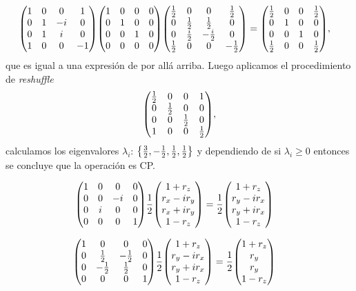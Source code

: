 
\begin{align}
\mqty(
 1 & 0 & 0 & 1 \\
 0 & 1 & -i & 0 \\
 0 & 1 & i & 0 \\
 1 & 0 & 0 & -1 
)
\mqty(
 1 & 0 & 0 & 0 \\
 0 & 1 & 0 & 0 \\
 0 & 0 & 1 & 0 \\
 0 & 0 & 0 & 0 
)
\mqty(
 \frac{1}{2} & 0 & 0 & \frac{1}{2} \\
 0 & \frac{1}{2} & \frac{1}{2} & 0 \\
 0 & \frac{i}{2} & -\frac{i}{2} & 0 \\
 \frac{1}{2} & 0 & 0 & -\frac{1}{2} 
)
&=
\mqty(
 \frac{1}{2} & 0 & 0 & \frac{1}{2} \\
 0 & 1 & 0 & 0 \\
 0 & 0 & 1 & 0 \\
 \frac{1}{2} & 0 & 0 & \frac{1}{2} 
),
\end{align}
que es igual a una expresión de por allá arriba. Luego 
aplicamos el procedimiento de \textit{reshuffle}
\begin{align}
\mqty(
 \frac{1}{2} & 0 & 0 & 1 \\
 0 & \frac{1}{2} & 0 & 0 \\
 0 & 0 & \frac{1}{2} & 0 \\
 1 & 0 & 0 & \frac{1}{2}
),
\end{align}
calculamos los eigenvalores $\lambda_i$: 
$\qty{\frac{3}{2},-\frac{1}{2},\frac{1}{2},\frac{1}{2}}$
y dependiendo de si $\lambda_i\geq 0$ entonces se concluye
que la operación es CP.

\begin{align}
\mqty(
 1 & 0 & 0 & 0 \\
 0 & 0 & -i & 0 \\
 0 & i & 0 & 0 \\
 0 & 0 & 0 & 1 
)
\frac{1}{2}
\mqty(
1+r_z\\r_x-ir_y\\r_x+ir_y\\1-r_z
)
&=
\frac{1}{2}
\mqty(
1+r_z\\r_y-ir_x\\r_y+ir_x\\1-r_z
)
\end{align}

\begin{align}
\mqty(
 1 & 0 & 0 & 0 \\
 0 & \frac{1}{2} & -\frac{1}{2} & 0 \\
 0 & -\frac{1}{2} & \frac{1}{2} & 0 \\
 0 & 0 & 0 & 1 
)
\frac{1}{2}
\mqty(
1+r_z\\r_y-ir_x\\r_y+ir_x\\1-r_z
)
&=
\frac{1}{2}
\mqty(
1+r_z\\r_y\\r_y\\1-r_z
)
\end{align}

